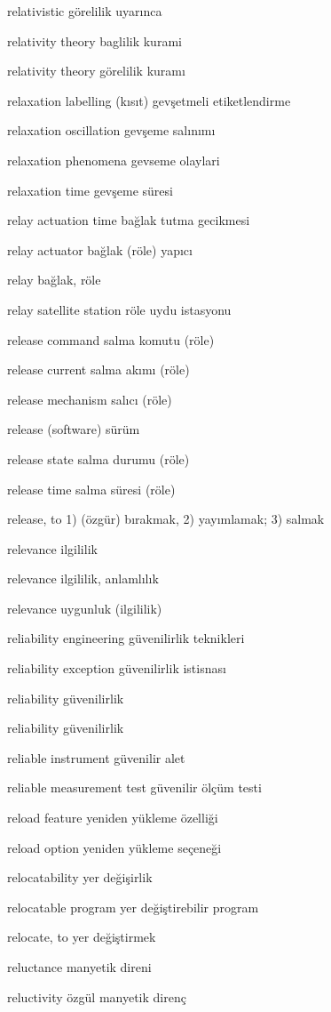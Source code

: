 \documentclass[12pt,fleqn]{article}\usepackage{../../common}
\begin{document}
relativistic görelilik uyarınca

relativity theory baglilik kurami

relativity theory görelilik kuramı

relaxation labelling (kısıt) gevşetmeli etiketlendirme

relaxation oscillation gevşeme salınımı

relaxation phenomena gevseme olaylari

relaxation time gevşeme süresi

relay actuation time bağlak tutma gecikmesi

relay actuator bağlak (röle) yapıcı

relay bağlak, röle

relay satellite station röle uydu istasyonu

release command salma komutu (röle)

release current salma akımı (röle)

release mechanism salıcı (röle)

release (software) sürüm

release state salma durumu (röle)

release time salma süresi (röle)

release, to 1) (özgür) bırakmak, 2) yayımlamak; 3) salmak

relevance ilgililik

relevance ilgililik, anlamlılık

relevance uygunluk (ilgililik)

reliability engineering güvenilirlik teknikleri

reliability exception güvenilirlik istisnası

reliability güvenilirlik

reliability güvenilirlik

reliable instrument güvenilir alet

reliable measurement test güvenilir ölçüm testi

reload feature yeniden yükleme özelliği

reload option yeniden yükleme seçeneği

relocatability yer değişirlik

relocatable program yer değiştirebilir program

relocate, to yer değiştirmek

reluctance manyetik direni

reluctivity özgül manyetik direnç
\end{document}
